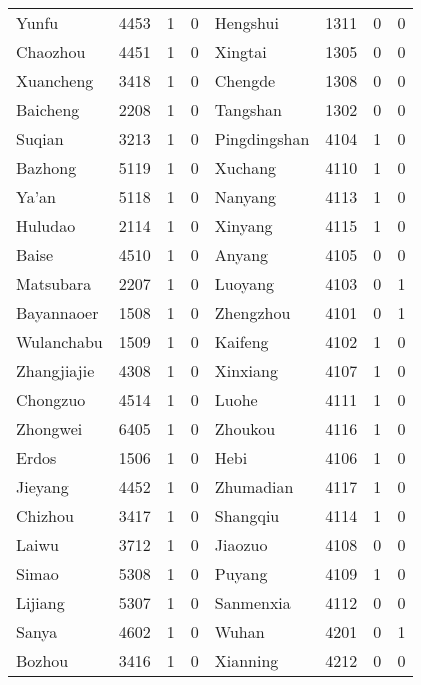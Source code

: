 \documentclass[12pt]{article}
\begin{document}
\begin{table}[!htb]
\begin{adjustbox}{width=\textwidth, totalheight=\baselineskip,keepaspectratio}
\begin{tabular}{llrlllrl}
       Yunfu &  4453 &    1 &   0 &      Hengshui &  1311 &    0 &   0 \\
    Chaozhou &  4451 &    1 &   0 &       Xingtai &  1305 &    0 &   0 \\
   Xuancheng &  3418 &    1 &   0 &       Chengde &  1308 &    0 &   0 \\
    Baicheng &  2208 &    1 &   0 &      Tangshan &  1302 &    0 &   0 \\
      Suqian &  3213 &    1 &   0 &  Pingdingshan &  4104 &    1 &   0 \\
     Bazhong &  5119 &    1 &   0 &       Xuchang &  4110 &    1 &   0 \\
       Ya'an &  5118 &    1 &   0 &       Nanyang &  4113 &    1 &   0 \\
     Huludao &  2114 &    1 &   0 &       Xinyang &  4115 &    1 &   0 \\
       Baise &  4510 &    1 &   0 &        Anyang &  4105 &    0 &   0 \\
   Matsubara &  2207 &    1 &   0 &       Luoyang &  4103 &    0 &   1 \\
  Bayannaoer &  1508 &    1 &   0 &     Zhengzhou &  4101 &    0 &   1 \\
  Wulanchabu &  1509 &    1 &   0 &       Kaifeng &  4102 &    1 &   0 \\
 Zhangjiajie &  4308 &    1 &   0 &      Xinxiang &  4107 &    1 &   0 \\
    Chongzuo &  4514 &    1 &   0 &         Luohe &  4111 &    1 &   0 \\
    Zhongwei &  6405 &    1 &   0 &       Zhoukou &  4116 &    1 &   0 \\
       Erdos &  1506 &    1 &   0 &          Hebi &  4106 &    1 &   0 \\
     Jieyang &  4452 &    1 &   0 &     Zhumadian &  4117 &    1 &   0 \\
     Chizhou &  3417 &    1 &   0 &      Shangqiu &  4114 &    1 &   0 \\
       Laiwu &  3712 &    1 &   0 &       Jiaozuo &  4108 &    0 &   0 \\
       Simao &  5308 &    1 &   0 &        Puyang &  4109 &    1 &   0 \\
     Lijiang &  5307 &    1 &   0 &     Sanmenxia &  4112 &    0 &   0 \\
       Sanya &  4602 &    1 &   0 &         Wuhan &  4201 &    0 &   1 \\
      Bozhou &  3416 &    1 &   0 &      Xianning &  4212 &    0 &   0 \\

\end{tabular}
\end{adjustbox}
\end{table}
\end{document}
